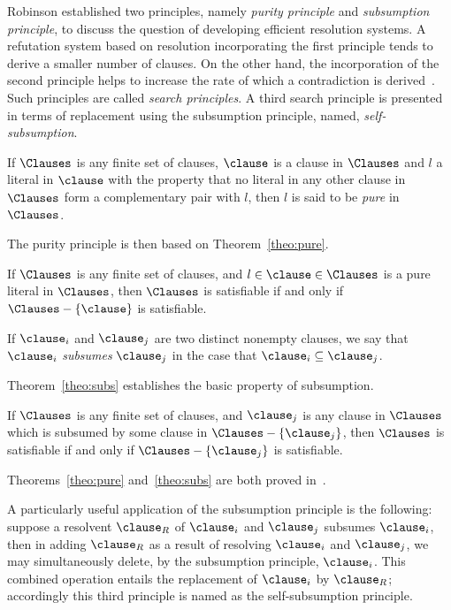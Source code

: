 Robinson established two principles, namely \emph{purity principle} and
\emph{subsumption principle}, to discuss the question of developing efficient
resolution systems. A refutation system based on resolution incorporating the
first principle tends to derive a smaller number of clauses.  On the other hand,
the incorporation of the second principle helps to increase the rate of which a
contradiction is derived~\cite{Robinson65}. Such principles are called
\emph{search principles}.  A third search principle is presented in terms of
replacement using the subsumption principle, named, \emph{self-subsumption}. 

\begin{definition}
    If $\Clauses$ is any finite set of clauses, $\clause$ is a clause in
    $\Clauses$ and $l$ a literal in $\clause$ with the property that no literal
    in any other clause in $\Clauses$ form a complementary pair with $l$, then
    $l$ is said to be \emph{pure} in $\Clauses$.
\end{definition}

The purity principle is then based on Theorem~\ref{theo:pure}.

\begin{theorem}%
    \label{theo:pure}
    If $\Clauses$ is any finite set of clauses, and $l \in \clause \in \Clauses$
    is a pure literal in $\Clauses$, then $\Clauses$ is satisfiable if and only
    if $\Clauses - \{\clause\}$ is satisfiable.
\end{theorem}

\begin{definition}
    If $\clause_i$ and $\clause_j$ are two distinct nonempty clauses, we say
    that $\clause_i$ \emph{subsumes} $\clause_j$ in the case that $\clause_i
    \subseteq \clause_j$. 
\end{definition}

Theorem~\ref{theo:subs} establishes the basic property of subsumption.

\begin{theorem}%
    \label{theo:subs}
    If $\Clauses$ is any finite set of clauses, and $\clause_j$ is any clause
    in $\Clauses$ which is subsumed by some clause in $\Clauses -
    \{\clause_j\}$, then $\Clauses$ is satisfiable if and only if $\Clauses -
    \{\clause_j\}$ is satisfiable.
\end{theorem}

Theorems~\ref{theo:pure} and~\ref{theo:subs} are both proved in~\cite{Robinson65}.

A particularly useful application of the subsumption principle is the following:
suppose a resolvent $\clause_R$ of $\clause_i$ and $\clause_j$ subsumes
$\clause_i$, then in adding $\clause_R$ as a result of resolving $\clause_i$ and
$\clause_j$, we may simultaneously delete, by the subsumption principle,
$\clause_i$. This combined operation entails the replacement of $\clause_i$ by
$\clause_R$; accordingly this third principle is named as the
self-subsumption principle.

